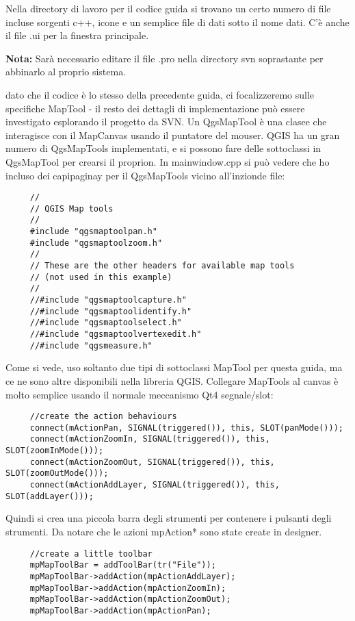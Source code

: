 Nella directory di lavoro per il codice guida si trovano un certo numero di file incluse sorgenti c++, icone e un semplice file di dati sotto il nome dati. C'è anche il file .ui per la finestra principale.

\textbf{Nota:} Sarà necessario editare il file .pro nella directory svn soprastante per abbinarlo al proprio sistema.

dato che il codice è lo stesso della precedente guida, ci focalizzeremo sulle specifiche MapTool - il resto dei dettagli di implementazione può essere investigato esplorando il progetto da SVN. Un QgsMapTool è una clasee che interagisce con il MapCanvas usando il puntatore del mouser. QGIS ha un gran numero di QgsMapTools implementati, e si possono fare delle sottoclassi in QgsMapTool per crearsi il proprion. In mainwindow.cpp si può vedere che ho incluso dei capipaginay per il QgsMapTools vicino all'inzionde file:

\begin{verbatim}
     //
     // QGIS Map tools
     //
     #include "qgsmaptoolpan.h"
     #include "qgsmaptoolzoom.h"
     //
     // These are the other headers for available map tools 
     // (not used in this example)
     //
     //#include "qgsmaptoolcapture.h"
     //#include "qgsmaptoolidentify.h"
     //#include "qgsmaptoolselect.h"
     //#include "qgsmaptoolvertexedit.h"
     //#include "qgsmeasure.h"
\end{verbatim}

Come si vede, uso soltanto due tipi di sottoclassi MapTool per questa guida, ma ce ne sono altre disponibili nella libreria QGIS. Collegare MapTools al canvas è molto semplice usando il normale meccanismo Qt4 segnale/slot:

\begin{verbatim}
     //create the action behaviours
     connect(mActionPan, SIGNAL(triggered()), this, SLOT(panMode()));
     connect(mActionZoomIn, SIGNAL(triggered()), this, SLOT(zoomInMode()));
     connect(mActionZoomOut, SIGNAL(triggered()), this, SLOT(zoomOutMode()));
     connect(mActionAddLayer, SIGNAL(triggered()), this, SLOT(addLayer()));
\end{verbatim}

Quindi si crea una piccola barra degli strumenti per contenere i pulsanti degli strumenti. Da notare che le azioni mpAction* sono state create in designer.

\begin{verbatim}
     //create a little toolbar
     mpMapToolBar = addToolBar(tr("File"));
     mpMapToolBar->addAction(mpActionAddLayer);
     mpMapToolBar->addAction(mpActionZoomIn);
     mpMapToolBar->addAction(mpActionZoomOut);
     mpMapToolBar->addAction(mpActionPan);
\end{verbatim}

